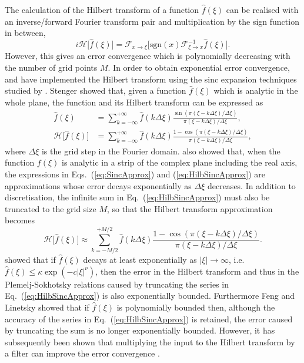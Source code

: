 \documentclass[11pt,a4paper]{article}
\begin{document}
The calculation of the Hilbert transform of a function $\widehat{f}(\xi)$ can be realised with an inverse/forward Fourier transform pair and multiplication by the sign function in between,
\begin{equation}
i\mathcal{H}\big[\widehat{f}(\xi)\big]=\mathcal{F}_{x\rightarrow\xi}\big[\mathrm{sgn}(x)\mathcal{F}^{-1}_{\xi\rightarrow x}\widehat{f}(\xi)\big].
\end{equation}
However, this gives an error convergence which is polynomially decreasing with the number of grid points $M$. In order to obtain exponential error convergence, \cite{Feng2008} and \cite{Fusai2016} have implemented the Hilbert transform using the sinc expansion techniques studied by \cite{Stenger1993,Stenger2011}. Stenger showed that, given a function $\widehat{f}(\xi)$ which is analytic in the whole plane, the function and its Hilbert transform can be expressed as
\begin{align}
\widehat{f}(\xi)&=\sum^{+\infty}_{k=-\infty}\widehat{f}(k\Delta\xi)\frac{\sin(\pi(\xi-k\Delta\xi)/\Delta\xi)}{\pi(\xi-k\Delta\xi)/\Delta\xi},\label{eq:SincApprox}\\
\mathcal{H}\big[\widehat{f}(\xi)\big]&=\sum^{+\infty}_{k=-\infty}\widehat{f}(k\Delta\xi)\frac{1-\cos(\pi(\xi-k\Delta\xi)/\Delta\xi)}{\pi(\xi-k\Delta\xi)/\Delta\xi}, \label{eq:HilbSincApprox}
\end{align}
where $\Delta\xi$ is the grid step in the Fourier domain. \cite{Stenger1993} also showed that, when the function $f(\xi)$ is analytic in a strip of the complex plane including the real axis, the expressions in Eqs.~(\ref{eq:SincApprox}) and (\ref{eq:HilbSincApprox}) are approximations whose error decays exponentially as $\Delta\xi$ decreases. In addition to discretisation, the infinite sum in Eq.~(\ref{eq:HilbSincApprox}) must also be truncated to the grid size $M$, so that the Hilbert transform approximation becomes
\begin{equation}
\label{eq:HilbSincApproxTrunc}
\mathcal{H}\big[\widehat{f}(\xi)\big]\approx\sum^{+M/2}_{k=-M/2}\widehat{f}(k\Delta\xi)\frac{1-\cos(\pi(\xi-k\Delta\xi)/\Delta\xi)}{\pi(\xi-k\Delta\xi)/\Delta\xi}.
\end{equation}
\cite{Feng2008,Feng2009} showed that if $\widehat{f}(\xi)$ decays at least exponentially as $|\xi|\rightarrow\infty$, i.e.~$\widehat{f}(\xi)\leq \kappa \exp(-c |\xi|^{\nu})$, then the error in the Hilbert transform and thus in the Plemelj-Sokhotsky relations caused by truncating the series in Eq.~(\ref{eq:HilbSincApprox}) is also exponentially bounded. Furthermore Feng and Linetsky showed that if $\widehat{f}(\xi)$ is polynomially bounded then, although the accuracy of the series in Eq.~(\ref{eq:HilbSincApprox}) is retained, the error caused by truncating the sum is no longer exponentially bounded. %
However, it has subsequently been shown that multiplying the input to the Hilbert transform by a filter can improve the error convergence \citep{Phelan2017}.
\end{document}
